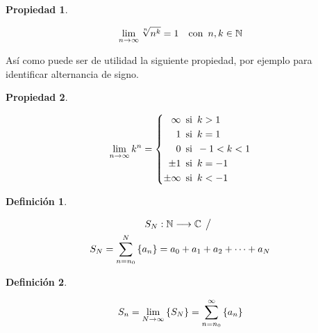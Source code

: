 \documentclass[a5paper,12pt,twoside]{book}
\newtheorem{defn}{{Definición}}[chapter]
\newtheorem{prop}{{Propiedad}}[chapter]
\begin{document}
\begin{mdframed}[style=PropertyFrame]
    \begin{prop}
    \end{prop}
    \begin{equation*}
        \lim_{n\to\infty} \sqrt[n]{n^k} = 1 \quad \textrm{con} \enspace n, k \in \mathbb{N}
    \end{equation*}
\end{mdframed}

Así como puede ser de utilidad la siguiente propiedad, por ejemplo para identificar alternancia de signo.

\begin{mdframed}[style=PropertyFrame]
    \begin{prop}
    \end{prop}
    \begin{equation*}
        \lim_{n\to\infty} k^n =
        \left\{
        \begin{aligned}
            \infty \enspace & \textrm{si} \enspace k>1
            \\
            1 \enspace & \textrm{si} \enspace k=1
            \\
            0 \enspace & \textrm{si} \enspace -1<k<1
            \\
            \pm 1 \enspace & \textrm{si} \enspace k = -1
            \\
            \pm \infty \enspace & \textrm{si} \enspace k<-1
        \end{aligned}
        \right.
    \end{equation*}
\end{mdframed}

\begin{mdframed}[style=DefinitionFrame]
    \begin{defn}
    \end{defn}
    \begin{gather*}
        S_N: \mathbb{N} \longrightarrow \mathbb{C} \hspace{1ex} \big/ \hspace{1ex}
        \\
        S_N = \sum_{n=n_0}^N { \left\{ {a_n} \right\} } = a_0 + a_1 + a_2 + \dots + a_N
    \end{gather*}
\end{mdframed}

\begin{mdframed}[style=DefinitionFrame]
    \begin{defn}
    \end{defn}
    \begin{equation*}
        S_n = \lim_{N \to \infty} { \left\{ {S_N} \right\} } = \sum_{n=n_0}^ \infty { \left\{ {a_n} \right\} }
    \end{equation*}
\end{mdframed}
\end{document}
